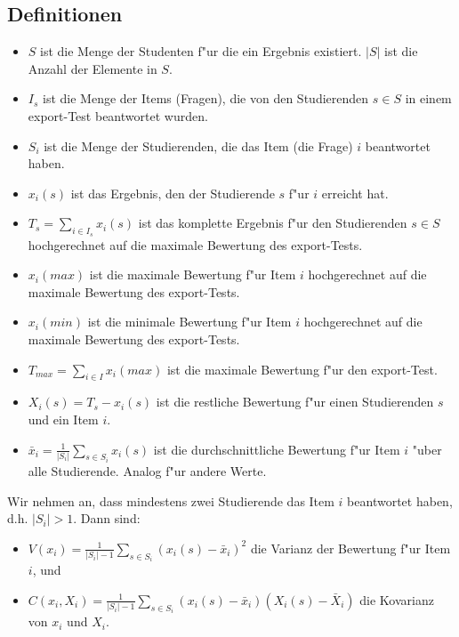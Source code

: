 \documentclass[12pt]{report}
\begin{document}
\subsection{Definitionen}
\label{subsubsec:definitions}
\begin{itemize}
\item $S$ ist die Menge der Studenten f"ur die ein Ergebnis existiert. $|S|$ ist die Anzahl der Elemente in $S$.
\item $I_s$ ist die Menge der Items (Fragen), die von den Studierenden $s\in S$ in einem export-Test beantwortet wurden.
\item $S_i$ ist die Menge der Studierenden, die das Item (die Frage) $i$ beantwortet haben.
\item $x_i(s)$ ist das Ergebnis, den der Studierende $s$ f"ur $i$ erreicht hat.
\item $T_s = \sum\limits_{i\in I_s} x_i(s)$ ist das komplette Ergebnis f"ur den Studierenden $s\in S$ hochgerechnet auf die maximale Bewertung des export-Tests.
\item $x_i(max)$ ist die maximale Bewertung f"ur Item $i$ hochgerechnet auf die maximale Bewertung des export-Tests. 
\item $x_i(min)$ ist die minimale Bewertung f"ur Item $i$ hochgerechnet auf die maximale Bewertung des export-Tests. 
\item $T_{max}=\sum\limits_{i\in I} x_i(max)$ ist die maximale Bewertung f"ur den export-Test.
\item $X_i(s) = T_s - x_i(s)$ ist die restliche Bewertung f"ur einen Studierenden $s$ und ein Item $i$.
\item $\bar{x}_i = \frac{1}{|S_i|}\sum\limits_{s\in S_i}x_i(s)$ ist die durchschnittliche Bewertung f"ur Item $i$ "uber alle Studierende. Analog f"ur andere Werte.
\end{itemize}

Wir nehmen an, dass mindestens zwei Studierende das Item $i$ beantwortet haben, d.h. $|S_i| > 1$.
Dann sind:
\begin{itemize}
\item $V(x_i) = \frac{1}{|S_i| - 1}\sum\limits_{s\in S_i} (x_i(s) - \bar{x}_i)^2$ die Varianz der Bewertung f"ur Item $i$, und
\item $C(x_i, X_i) = \frac{1}{|S_i| - 1}\sum\limits_{s\in S_i}(x_i(s) - \bar{x}_i)(X_i(s) - \bar{X}_i)$ die Kovarianz von $x_i$ und $X_i$.
\end{itemize}

\ \\
\end{document}
